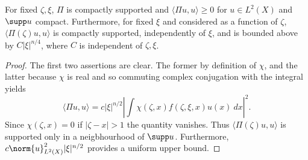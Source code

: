 \documentclass[12pt]{article}
\begin{document}
\begin{lem}\label{one}For fixed $\zeta,\xi$, $\Pi$ is compactly supported and $\langle \Pi u,u\rangle \geq 0$ for $u \in L^2(X)$ and $\supp u$ compact. Furthermore, for fixed $\xi$ and considered as a function of $\zeta$, $\langle \Pi(\zeta)u,u\rangle$ is compactly supported, independently of $\xi$, and is bounded above by $C|\xi|^{n/4}$, where $C$ is independent of $\zeta,\xi$. \end{lem}
\begin{proof}The first two assertions are clear. The former by definition of $\chi$, and the latter because $\chi$ is real and so commuting complex conjugation with the integral yields
\[\langle \Pi u,u\rangle = c|\xi|^{n/2}\left|\int \chi(\zeta,x)f(\zeta,\xi,x)u(x)\ dx\right|^2.\]
Since $\chi(\zeta,x) = 0$ if $|\zeta-x| > 1$ the quantity vanishes. Thus $\langle \Pi(\zeta)u,u\rangle$ is supported only in a neigbhourhood of $\supp u$. Furthermore, $c\norm{u}^2_{L^2(X)}|\xi|^{n/2}$ provides a uniform upper bound.
\end{proof}
\end{document}
